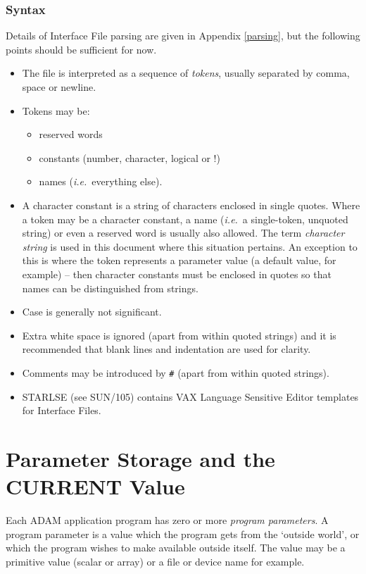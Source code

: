 \documentclass[twoside,11pt]{article}
\newcommand{\xlabel}[1]{}
\renewcommand{\_}{\texttt{\symbol{95}}}
\begin{document}
\subsubsection{Syntax}
Details of Interface File parsing are given in Appendix \ref{parsing}, but the
following points should be sufficient for now.
\begin{itemize}
\item The file is interpreted as a sequence of {\em tokens}, usually separated
by comma, space or newline.
\item Tokens may be:
\begin{itemize}
\item reserved words
\item constants (number, character, logical or !)
\item names ({\em i.e.}\ everything else).
\end {itemize}
\item A character constant is a string of characters enclosed in single quotes.
Where a token may be a character constant, a name ({\em i.e.}\ a 
single-token, unquoted string) or even a reserved word is usually also allowed.
The term {\em character string} is used in this document where this situation
pertains.
An exception to this is where the token represents a parameter value (a
default value, for example) -- then character constants must be enclosed in 
quotes so that names can be distinguished from strings.
\item Case is generally not significant.
\item Extra white space is ignored (apart from within quoted 
strings) and it is recommended that blank lines and indentation are used for 
clarity.
\item Comments may be introduced by \texttt{\#} (apart from within
quoted strings).
\item STARLSE (see SUN/105) contains VAX Language Sensitive Editor templates 
for Interface Files.
\end{itemize}

\section{Parameter Storage and the CURRENT Value\xlabel{parameter_storage}
\label{current}}

Each ADAM application program has zero or more {\em program parameters}.
A program parameter is a value which the program gets
from the `outside world', or which the program wishes to make available
outside itself. The value may be a primitive value (scalar or array) or a file 
or device name for example.
\end{document}
